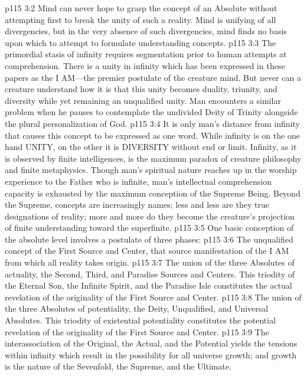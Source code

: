 \vs p115 3:2 Mind can never hope to grasp the concept of an Absolute without attempting first to break the unity of such a reality. Mind is unifying of all divergencies, but in the very absence of such divergencies, mind finds no basis upon which to attempt to formulate understanding concepts.
\vs p115 3:3 The primordial stasis of infinity requires segmentation prior to human attempts at comprehension. There is a unity in infinity which has been expressed in these papers as the I AM---the premier postulate of the creature mind. But never can a creature understand how it is that this unity becomes duality, triunity, and diversity while yet remaining an unqualified unity. Man encounters a similar problem when he pauses to contemplate the undivided Deity of Trinity alongside the plural personalization of God.
\vs p115 3:4 It is only man’s distance from infinity that causes this concept to be expressed as one word. While infinity is on the one hand UNITY, on the other it is DIVERSITY without end or limit. Infinity, as it is observed by finite intelligences, is the maximum paradox of creature philosophy and finite metaphysics. Though man’s spiritual nature reaches up in the worship experience to the Father who is infinite, man’s intellectual comprehension capacity is exhausted by the maximum conception of the Supreme Being. Beyond the Supreme, concepts are increasingly names; less and less are they true designations of reality; more and more do they become the creature’s projection of finite understanding toward the superfinite.
\pc \vs p115 3:5 One basic conception of the absolute level involves a postulate of three phases:
\pc \vs p115 3:6 \bibnobreakspace {} The unqualified concept of the First Source and Center, that source manifestation of the I AM from which all reality takes origin.
\pc \vs p115 3:7 \bibnobreakspace {} The union of the three Absolutes of actuality, the Second, Third, and Paradise Sources and Centers. This triodity of the Eternal Son, the Infinite Spirit, and the Paradise Isle constitutes the actual revelation of the originality of the First Source and Center.
\pc \vs p115 3:8 \bibnobreakspace {} The union of the three Absolutes of potentiality, the Deity, Unqualified, and Universal Absolutes. This triodity of existential potentiality constitutes the potential revelation of the originality of the First Source and Center.
\pc \vs p115 3:9 The interassociation of the Original, the Actual, and the Potential yields the tensions within infinity which result in the possibility for all universe growth; and growth is the nature of the Sevenfold, the Supreme, and the Ultimate.
